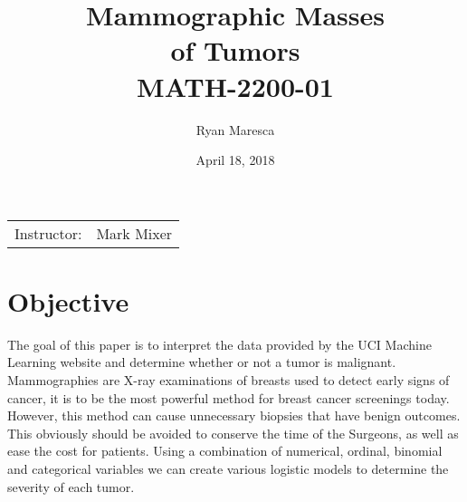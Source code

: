 \documentclass{article}
\title{Mammographic Masses \\ of Tumors \\ MATH-2200-01} %
\author{Ryan Maresca} %
\date{April 18, 2018} %
\begin{document}


\maketitle %

\begin{center}
\begin{tabular}{l r}
Instructor: & Mark Mixer %
\end{tabular}
\end{center}



\section{Objective}
The goal of this paper is to interpret the data provided by the UCI Machine Learning website and determine whether or not a tumor is malignant. Mammographies are X-ray examinations of breasts used to detect early signs of cancer, it is to be the most powerful method for breast cancer screenings today. However, this method can cause unnecessary biopsies that have benign outcomes. This obviously should be avoided to conserve the time of the Surgeons, as well as ease the cost for patients. Using a combination of numerical, ordinal, binomial and categorical variables we can create various logistic models to determine the severity of each tumor. 


\end{document}
